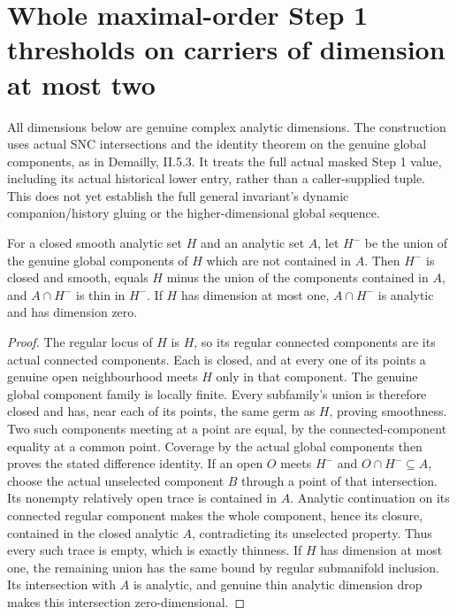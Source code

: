 \section{Whole maximal-order Step 1 thresholds on carriers of dimension at most two}

All dimensions below are genuine complex analytic dimensions. The construction
uses actual SNC intersections and the identity theorem on the genuine global
components, as in Demailly\cite{demailly-cadg}, II.5.3. It treats the full actual
masked Step 1 value, including its actual historical lower entry, rather than a
caller-supplied tuple. This does not yet establish the full general invariant's
dynamic companion/history gluing or the higher-dimensional global sequence.

\begin{lemma}
\label{hir:dimtwo-unselected-smooth-components}
\leanok
For a closed smooth analytic set $H$ and an analytic set $A$, let $H^-$ be
the union of the genuine global components of $H$ which are not contained
in $A$. Then $H^-$ is closed and smooth, equals $H$ minus the union of the
components contained in $A$, and $A\cap H^-$ is thin in $H^-$. If $H$
has dimension at most one, $A\cap H^-$ is analytic and has dimension zero.
\end{lemma}
\begin{proof}
The regular locus of $H$ is $H$, so its regular connected components are
its actual connected components. Each is closed, and at every one of its
points a genuine open neighbourhood meets $H$ only in that component.
The genuine global component family is locally finite. Every subfamily's
union is therefore closed and has, near each of its points, the same germ
as $H$, proving smoothness. Two such components meeting at a point are
equal, by the connected-component equality at a common point. Coverage by
the actual global components then proves the stated difference identity.
If an open $O$ meets $H^-$ and $O\cap H^-\subseteq A$, choose the actual
unselected component $B$ through a point of that intersection. Its nonempty
relatively open trace is contained in $A$. Analytic continuation on its
connected regular component makes the whole component, hence its closure,
contained in the closed analytic $A$, contradicting its unselected property.
Thus every such trace is empty, which is exactly thinness. If $H$ has
dimension at most one, the remaining union has the same bound by regular
submanifold inclusion. Its intersection with $A$ is analytic, and genuine
thin analytic dimension drop makes this intersection zero-dimensional.
\end{proof}


